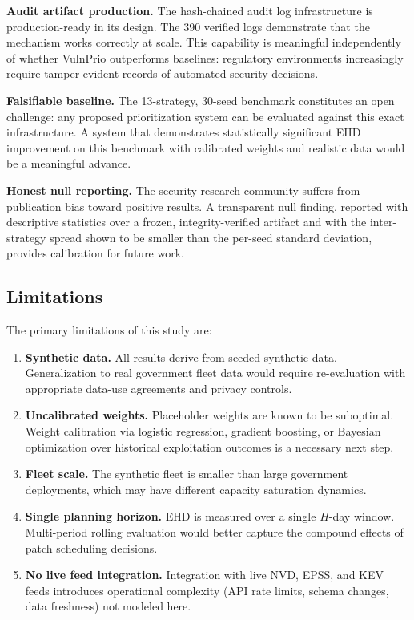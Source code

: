 \documentclass[journal]{IEEEtran}
\begin{document}
\textbf{Audit artifact production.} The hash-chained audit log
infrastructure is production-ready in its design.  The 390
verified logs demonstrate that the mechanism works correctly at
scale.  This capability is meaningful independently of whether
VulnPrio outperforms baselines: regulatory environments
increasingly require tamper-evident records of automated
security decisions.

\textbf{Falsifiable baseline.} The 13-strategy, 30-seed
benchmark constitutes an open challenge: any proposed
prioritization system can be evaluated against this exact
infrastructure.  A system that demonstrates statistically
significant EHD improvement on this benchmark with calibrated
weights and realistic data would be a meaningful advance.

\textbf{Honest null reporting.} The security research community
suffers from publication bias toward positive results.  A
transparent null finding, reported with descriptive statistics
over a frozen, integrity-verified artifact and with the inter-strategy
spread shown to be smaller than the per-seed standard deviation,
provides calibration for future work.

\subsection{Limitations}

The primary limitations of this study are:

\begin{enumerate}[leftmargin=*]
  \item \textbf{Synthetic data.}  All results derive from seeded
    synthetic data.  Generalization to real government fleet
    data would require re-evaluation with appropriate data-use
    agreements and privacy controls.

  \item \textbf{Uncalibrated weights.}  Placeholder weights are
    known to be suboptimal.  Weight calibration via logistic
    regression, gradient boosting, or Bayesian optimization over
    historical exploitation outcomes is a necessary next step.

  \item \textbf{Fleet scale.}  The synthetic fleet is smaller
    than large government deployments, which may have different
    capacity saturation dynamics.

  \item \textbf{Single planning horizon.}  EHD is measured over
    a single $H$-day window.  Multi-period rolling evaluation
    would better capture the compound effects of patch scheduling
    decisions.

  \item \textbf{No live feed integration.}  Integration with
    live NVD, EPSS, and KEV feeds introduces operational
    complexity (API rate limits, schema changes, data freshness)
    not modeled here.
\end{enumerate}
\end{document}
